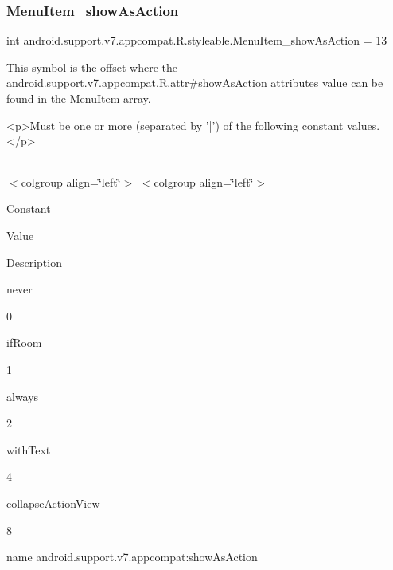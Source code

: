\subsubsection{\texorpdfstring{Menu\+Item\+\_\+show\+As\+Action}{MenuItem\_showAsAction}}
{\footnotesize\ttfamily int android.\+support.\+v7.\+appcompat.\+R.\+styleable.\+Menu\+Item\+\_\+show\+As\+Action = 13\hspace{0.3cm}{\ttfamily [static]}}

This symbol is the offset where the \hyperlink{classandroid_1_1support_1_1v7_1_1appcompat_1_1R_1_1attr_a37a658e9544ba1803be9daef3fbaa0e3}{android.\+support.\+v7.\+appcompat.\+R.\+attr\#show\+As\+Action} attribute\textquotesingle{}s value can be found in the \hyperlink{classandroid_1_1support_1_1v7_1_1appcompat_1_1R_1_1styleable_a3161bf75811c963572105d304c98b088}{Menu\+Item} array.

\begin{DoxyVerb}      <p>Must be one or more (separated by '|') of the following constant values.</p>
\end{DoxyVerb}
 \tabulinesep=1mm
\begin{longtabu} spread 0pt [c]{*{0}{|X[-1]}|}
\hline
\end{longtabu}
$<$colgroup align=\char`\"{}left\char`\"{}$>$ $<$colgroup align=\char`\"{}left\char`\"{}$>$ 

Constant

Value

Description 

{\ttfamily never}

0

{\ttfamily if\+Room}

1

{\ttfamily always}

2

{\ttfamily with\+Text}

4

{\ttfamily collapse\+Action\+View}

8

name android.\+support.\+v7.\+appcompat\+:show\+As\+Action \mbox{\label{classandroid_1_1support_1_1v7_1_1appcompat_1_1R_1_1styleable_ab45f4f3fe3b636a3730a9fb26bfa1050}} 
